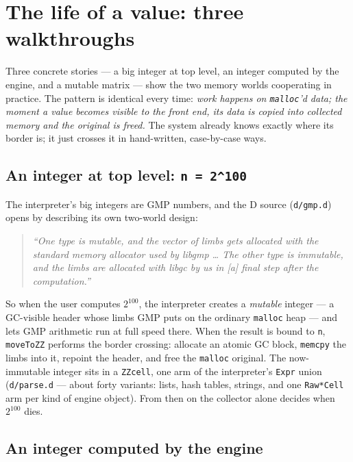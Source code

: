 \documentclass[11pt,oneside]{report}
\newcommand{\code}[1]{\textcolor{m2code}{\texttt{#1}}}
\newcommand{\file}[1]{\textcolor{m2file}{\texttt{#1}}}
\begin{document}
\section{The life of a value: three walkthroughs}
\label{sec:life}

\begin{inbrief}
Three concrete stories --- a big integer at top level, an integer computed by
the engine, and a mutable matrix --- show the two memory worlds cooperating
in practice. The pattern is identical every time: \emph{work happens on
\code{malloc}'d data; the moment a value becomes visible to the front end,
its data is copied into collected memory and the original is freed.} The
system already knows exactly where its border is; it just crosses it in
hand-written, case-by-case ways.
\end{inbrief}

\subsection{An integer at top level: \code{n = 2\^{}100}}

The interpreter's big integers are GMP numbers, and the D source
(\file{d/gmp.d}) opens by describing its own two-world design:

\begin{quote}\itshape
``One type is mutable, and the vector of limbs gets allocated with the
standard memory allocator used by libgmp \ldots{} The other type is
immutable, and the limbs are allocated with libgc by us in [a] final step
after the computation.''
\end{quote}

\noindent So when the user computes $2^{100}$, the interpreter creates a
\emph{mutable} integer --- a GC-visible header whose limbs GMP puts on the
ordinary \code{malloc} heap --- and lets GMP arithmetic run at full speed
there. When the result is bound to \code{n}, \code{moveToZZ} performs the
border crossing: allocate an atomic GC block, \code{memcpy} the limbs into
it, repoint the header, and free the \code{malloc} original. The now-immutable
integer sits in a \code{ZZcell}, one arm of the interpreter's \code{Expr}
union (\file{d/parse.d} --- about forty variants: lists, hash tables,
strings, and one \code{Raw*Cell} arm per kind of engine object). From then
on the collector alone decides when $2^{100}$ dies.

\subsection{An integer computed by the engine}
\end{document}
